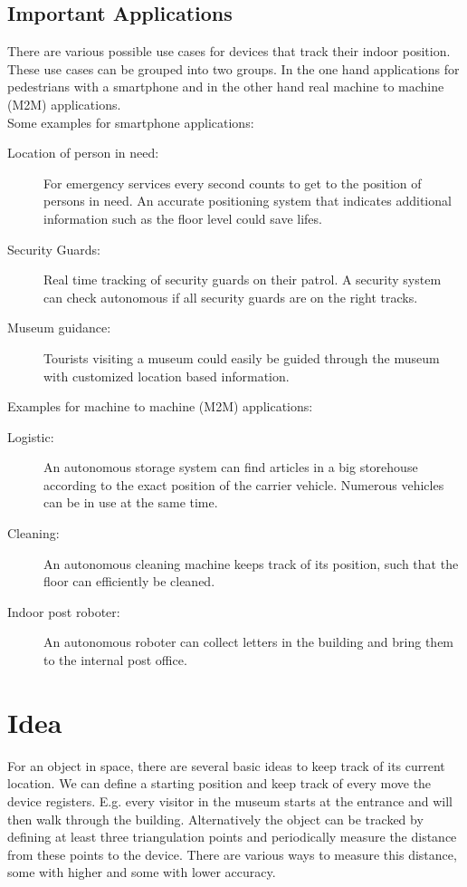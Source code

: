 
\subsection{Important Applications}
There are various possible use cases for devices that track their indoor position. These use cases can be grouped into two groups. In the one hand applications for pedestrians with a smartphone and in the other hand real machine to machine (M2M) applications. \\
Some examples for smartphone applications:
\begin{description}
\item [Location of person in need:] For emergency services every second counts to get to the position of persons in need. An accurate positioning system that indicates additional information such as the floor level could save lifes.
\item [Security Guards:] Real time tracking of security guards on their patrol. A security system can check autonomous if all security guards are on the right tracks.
\item [Museum guidance:] Tourists visiting a museum could easily be guided through the museum with customized location based information.
\end{description}
Examples for machine to machine (M2M) applications:
\begin{description}
\item [Logistic:] An autonomous storage system can find articles in a big storehouse according to the exact position of the carrier vehicle. Numerous vehicles can be in use at the same time.
\item [Cleaning:] An autonomous cleaning machine keeps track of its position, such that the floor can efficiently be cleaned.
\item [Indoor post roboter:] An autonomous roboter can collect letters in the building and bring them to the internal post office.
\end{description}



\section{Idea}
For an object in space, there are several basic ideas to keep track of its current location. We can define a starting position and keep track of every move the device registers. E.g. every visitor in the museum starts at the entrance and will then walk through the building.
Alternatively the object can be tracked by defining at least three triangulation points and periodically measure the distance from these points to the device. There are various ways to measure this distance, some with higher and some with lower accuracy.

